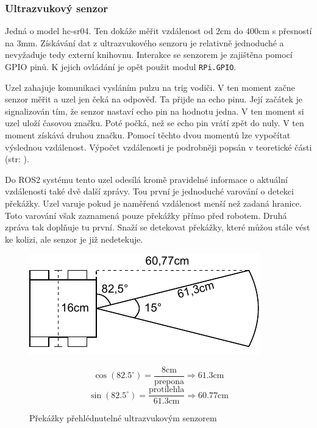 \subsubsection*{Ultrazvukový senzor}
Jedná o model hc-sr04. Ten dokáže měřit vzdálenost od 2cm do 400cm s přesností na 3mm. Získávání dat z ultrazvukového senzoru je relativně jednoduché a nevyžaduje tedy externí knihovnu. Interakce se senzorem je zajištěna pomocí GPIO pinů. K jejich ovládání je opět použit modul \verb|RPi.GPIO|. 

Uzel zahajuje komunikaci vysláním pulzu na trig vodiči. V ten moment začne senzor měřit a uzel jen čeká na odpověď. Ta přijde na echo pinu. Její začátek je signalizován tím, že senzor nastaví echo pin na hodnotu jedna. V ten moment si uzel uloží časovou značku. Poté počká, než se echo pin vrátí zpět do nuly. V ten moment získává druhou značku. Pomocí těchto dvou momentů lze vypočítat výslednou vzdálenost. Výpočet vzdálenosti je podrobněji popsán v teoretické části (str: \pageref{theory:ultrasonic}).

Do ROS2 systému tento uzel odesílá kromě pravidelné informace o aktuální vzdálenosti také dvě další zprávy. Tou první je jednoduché varování o detekci překážky. Uzel varuje pokud je naměřená vzdálenost menší než zadaná hranice. Toto varování však zaznamená pouze překážky přímo před robotem. Druhá zpráva tak doplňuje tu první. Snaží se detekovat překážky, které můžou stále vést ke kolizi, ale senzor je již nedetekuje. 

\begin{figure}[h!]
	\centering
	\begin{minipage}[c]{0.5\textwidth}
		\centering
		\includegraphics[scale=1.0]{obrazky-figures/ultrasonic_blind_spot.pdf}
	\end{minipage}%
	\begin{minipage}[c]{0.5\textwidth}
			$$\cos(82.5^\circ) = \frac{8\text{cm}}{\text{prepona}} \Rightarrow 61.3\text{cm}$$
			$$\sin(82.5^\circ) = \frac{\text{protilehla}}{61.3\text{cm}} \Rightarrow 60.77\text{cm}$$
	\end{minipage}
	\caption{Překážky přehlédnutelné ultrazvukovým senzorem}
	\label{}
\end{figure}

